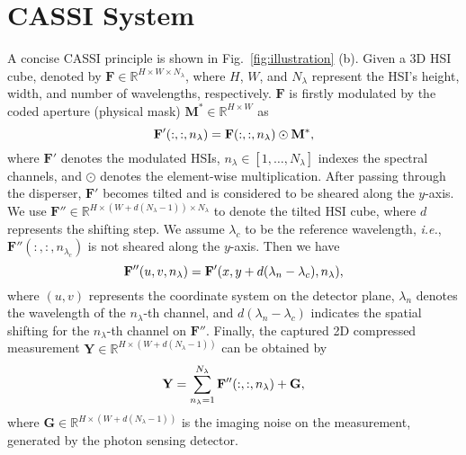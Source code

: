 \documentclass[10pt,twocolumn,letterpaper]{article}
\begin{document}
\section{CASSI System}
\vspace{-0.3mm}
A concise CASSI principle is shown in Fig.~\ref{fig:illustration} (b). Given a 3D HSI cube, denoted by $\mathbf{F} \in \mathbb{R}^{H\times W \times N_{\lambda}}$, where $H$, $W$, and $N_\lambda$ represent the HSI's height, width, and number of wavelengths, respectively. $\mathbf{F}$ is firstly modulated by the coded aperture (physical mask) $\mathbf{M^*} \in \mathbb{R}^{H\times W}$ as 
\vspace{-1.2mm}
\begin{equation}\label{eq:Fprime}
\mathbf{F}' (:,:,n_{\lambda}) = \mathbf{F} (:,:,n_{\lambda}) \odot \mathbf{M^*},
\vspace{-1.2mm}
\end{equation} 
where $\mathbf{F}'$ denotes the modulated HSIs, $n_{\lambda} \in [1,\dots, N_{\lambda}]$ indexes the spectral channels, and $\odot$ denotes the element-wise multiplication. After passing through the disperser, $\mathbf{F}'$ becomes tilted and is considered to be  sheared along the $y$-axis. We use $\mathbf{F}'' \in \mathbb{R}^{H\times (W + d(N_{\lambda}-1)) \times N_{\lambda}}$ to denote the tilted HSI cube, where $d$ represents the shifting step. We assume $\lambda_c$ to be the reference wavelength, \emph{i.e.}, $\mathbf{F}'' (:,:,n_{\lambda_c})$ is not sheared along the $y$-axis.  Then we have\vspace{-1.2mm}
\begin{equation}\label{eq:Fprime_prime}
\mathbf{F}'' (u,v, n_{\lambda}) = \mathbf{F}'(x, y + d(\lambda_n - \lambda_c), n_{\lambda}),
\vspace{-1.2mm}
\end{equation}
where $(u,v)$ represents the coordinate system on the detector plane, $\lambda_n$ denotes the wavelength of the $n_\lambda$-th channel, and $d(\lambda_n -\lambda_c)$ indicates the spatial shifting for the $n_\lambda$-th channel on $\mathbf{F}''$. Finally, the captured 2D compressed measurement $\mathbf{Y} \in \mathbb{R}^{H\times (W + d(N_{\lambda}-1))}$ can be obtained by
\vspace{-3.5mm}
\begin{equation}\label{eq:y-discret}
 \mathbf{Y} = \sum_{n_{\lambda}=1}^{N_{\lambda}}  \mathbf{F}'' (:,:, n_{\lambda}) +  \mathbf{G}, 
 \vspace{-1.5mm}
\end{equation}
where $\mathbf{G}\in \mathbb{R}^{H\times (W + d(N_{\lambda}-1))}$ is the imaging noise on the measurement, generated by the photon sensing detector. 
\end{document}
